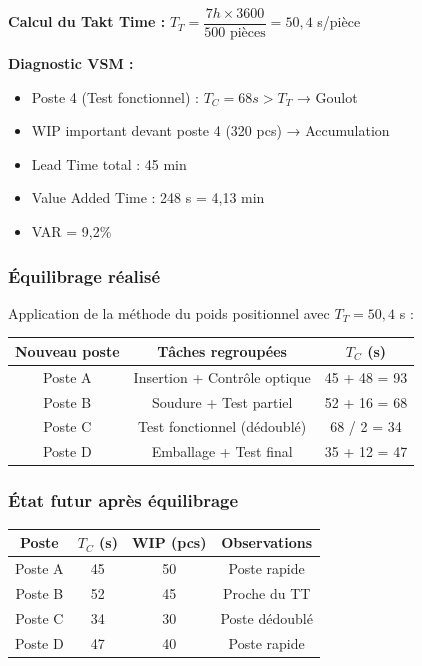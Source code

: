 \documentclass[12pt,a4paper]{article}
\begin{document}
\textbf{Calcul du Takt Time :} $T_T = \dfrac{7h \times 3600}{500 \text{ pièces}} = 50,4$ s/pièce

\textbf{Diagnostic VSM :}
\begin{itemize}
    \item Poste 4 (Test fonctionnel) : $T_C = 68s > T_T$ → Goulot
    \item WIP important devant poste 4 (320 pcs) → Accumulation
    \item Lead Time total : 45 min
    \item Value Added Time : 248 s = 4,13 min
    \item VAR = 9,2\%
\end{itemize}

\subsubsection{Équilibrage réalisé}

Application de la méthode du poids positionnel avec $T_T = 50,4$ s :

\begin{table}[H]
\centering
\begin{tabular}{|c|c|c|}
\hline
\textbf{Nouveau poste} & \textbf{Tâches regroupées} & \textbf{$T_C$ (s)} \\
\hline
Poste A & Insertion + Contrôle optique & 45 + 48 = 93 \\
\hline
Poste B & Soudure + Test partiel & 52 + 16 = 68 \\
\hline
Poste C & Test fonctionnel (dédoublé) & 68 / 2 = 34 \\
\hline
Poste D & Emballage + Test final & 35 + 12 = 47 \\
\hline
\end{tabular}
\end{table}

\subsubsection{État futur après équilibrage}

\begin{table}[H]
\centering
\begin{tabular}{|c|c|c|c|}
\hline
\textbf{Poste} & \textbf{$T_C$ (s)} & \textbf{WIP (pcs)} & \textbf{Observations} \\
\hline
Poste A & 45 & 50 & Poste rapide \\
\hline
Poste B & 52 & 45 & Proche du TT \\
\hline
Poste C & 34 & 30 & Poste dédoublé \\
\hline
Poste D & 47 & 40 & Poste rapide \\
\hline
\end{tabular}
\end{table}
\end{document}
